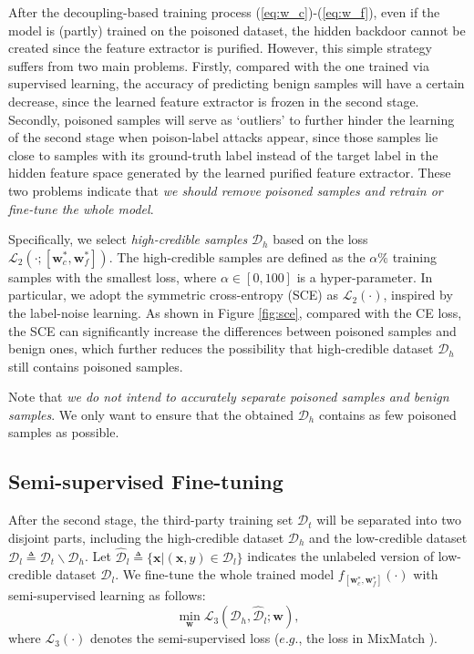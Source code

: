 After the decoupling-based training process (\ref{eq:w_c})-(\ref{eq:w_f}), even if the model is (partly) trained on the poisoned dataset, the hidden backdoor cannot be created since the feature extractor is purified. However, this simple strategy suffers from two main problems. Firstly, compared with the one trained via supervised learning, the accuracy of predicting benign samples will have a certain decrease, since the learned feature extractor is frozen in the second stage. %
Secondly, poisoned samples will serve as `outliers' to further hinder the learning of the second stage when poison-label attacks appear, since those samples lie close to samples with its ground-truth label instead of the target label in the hidden feature space generated by the learned purified feature extractor. These two problems indicate that \emph{we should remove poisoned samples and retrain or fine-tune the whole model}.

Specifically, we select \emph{high-credible samples} $\mathcal{D}_h$ based on the loss $\mathcal{L}_2(\cdot; [\bm{w}_c^{*},\bm{w}_f^{*}])$. The high-credible samples are defined as the $\alpha\%$ training samples with the smallest loss, where $\alpha \in [0, 100]$ is a hyper-parameter. In particular, we adopt the symmetric cross-entropy (SCE) \citep{wang2019symmetric} as $\mathcal{L}_2(\cdot)$, inspired by the label-noise learning. As shown in Figure \ref{fig:sce}, compared with the CE loss, the SCE can significantly increase the differences between poisoned samples and benign ones, which further reduces the possibility that high-credible dataset $\mathcal{D}_h$ still contains poisoned samples.   

Note that \emph{we do not intend to accurately separate poisoned samples and benign samples}. We only want to ensure that the obtained $\mathcal{D}_h$ contains as few poisoned samples as possible.

\subsection{Semi-supervised Fine-tuning}
\label{sec:semi}
After the second stage, the third-party training set $\mathcal{D}_t$ will be separated into two disjoint parts, including the high-credible dataset $\mathcal{D}_h$ and the low-credible dataset $\mathcal{D}_l \triangleq \mathcal{D}_t \backslash \mathcal{D}_h$. Let $\hat{\mathcal{D}}_l \triangleq \{\bm{x}|(\bm{x}, y) \in \mathcal{D}_l\}$ indicates the unlabeled version of low-credible dataset $\mathcal{D}_l$. We fine-tune the whole trained model $f_{[\bm{w}_c^{*},\bm{w}_f^{*}]}(\cdot)$ with semi-supervised learning as follows:
\begin{equation}
    \min_{\bm{w}} \mathcal{L}_3 (\mathcal{D}_h,\hat{\mathcal{D}}_l;\bm{w} ),
\end{equation}
where %
$\mathcal{L}_3(\cdot)$ denotes the semi-supervised loss ($e.g.$, the loss in MixMatch \citep{berthelot2019mixmatch}). 

